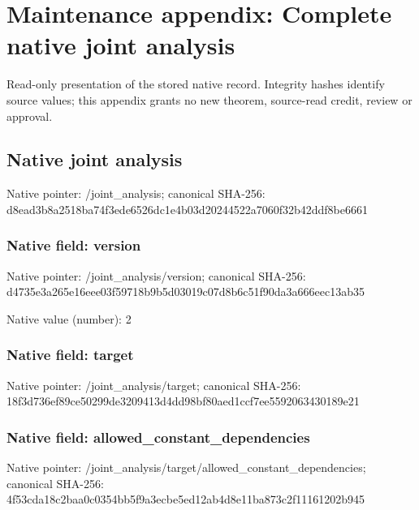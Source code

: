 \documentclass[10pt,a4paper]{article}
\begin{document}
\section{Maintenance appendix: Complete native joint analysis}


Read-only presentation of the stored native record. Integrity hashes identify source values; this appendix grants no new theorem, source-read credit, review or approval.



\subsection{Native joint analysis}


Native pointer: /joint\_analysis; canonical SHA-256: d8ead3b8a2518ba74f3ede65\allowbreak{}26dc1e4b03d20244522a7060\allowbreak{}f32b42ddf8be6661



\subsubsection{Native field: version}


Native pointer: /joint\_analysis/version; canonical SHA-256: d4735e3a265e16eee03f5971\allowbreak{}8b9b5d03019c07d8b6c51f90\allowbreak{}da3a666eec13ab35



Native value (number): 2



\subsubsection{Native field: target}


Native pointer: /joint\_analysis/target; canonical SHA-256: 18f3d736ef89ce50299de320\allowbreak{}9413d4dd98bf80aed1ccf7ee\allowbreak{}5592063430189e21



\subsubsection{Native field: allowed\_constant\_dependencies}


Native pointer: /joint\_analysis/target/a\allowbreak{}llowed\_constant\_dependen\allowbreak{}cies; canonical SHA-256: 4f53cda18c2baa0c0354bb5f\allowbreak{}9a3ecbe5ed12ab4d8e11ba87\allowbreak{}3c2f11161202b945
\end{document}
